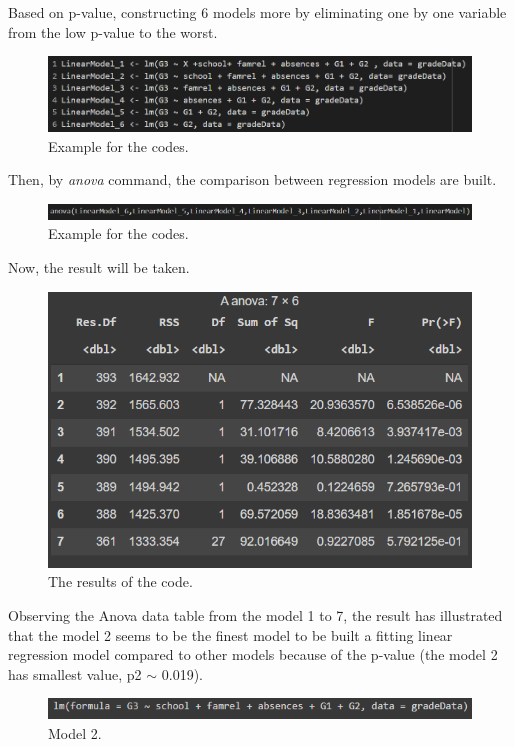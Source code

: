 \documentclass[a4paper]{article}
\begin{document}
Based on p-value, constructing 6 models more by eliminating one by one variable from the low p-value to the worst.
\begin{figure}[H]
    \centering
    \includegraphics[scale = 0.8]{Images/45.PNG}
    \caption{Example for the codes.}
    \label{fig:linear3}
\end{figure}
Then, by \textit{anova} command, the comparison between regression models are built.
\begin{figure}[H]
    \centering
    \includegraphics[scale = 0.8]{Images/46.PNG}
    \caption{Example for the codes.}
    \label{fig:linear4}
\end{figure}
Now, the result will be taken.
\begin{figure}[H]
    \centering
    \includegraphics[scale = 1]{Images/47.PNG}
    \caption{The results of the code.}
    \label{fig:linear5}
\end{figure}
Observing the Anova data table from the model 1 to 7, the result has illustrated that the model 2 seems to be the finest model to be built a fitting linear regression model compared to other models because of the p-value (the model 2 has smallest value, p2 $\sim$ 0.019).
\begin{figure}[H]
    \centering
    \includegraphics[scale = 1.3]{Images/48.PNG}
    \caption{Model 2.}
    \label{fig:linear6}
\end{figure}
\end{document}
